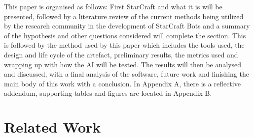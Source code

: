 \documentclass[journal]{IEEEtran}
\begin{document}
	This paper is organised as follows:
	First StarCraft and what it is will be presented, followed by a literature review of the current methods being utilized by the research community in the development of StarCraft Bots and a summary of the hypothesis and other questions considered will complete the section. This is followed by the method used by this paper which includes the tools used, the design and life cycle of the artefact, preliminary results, the metrics used and wrapping up with how the AI will be tested. The results will then be analysed and discussed, with a final analysis of the software, future work and finishing the main body of this work with a conclusion. In Appendix A, there is a  reflective addendum, supporting tables and figures are located in Appendix B.
	
	\section{Related Work}
\end{document}
